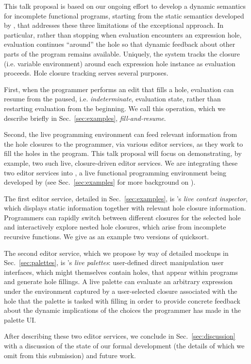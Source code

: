 This talk proposal is based on our ongoing effort to develop a dynamic semantics for incomplete functional programs, starting from the static semantics developed by \citet{popl-paper},  that addresses these three limitations of the exceptional approach. 
In particular, rather than stopping when evaluation encounters an expression hole, evaluation continues ``around'' the hole so that dynamic feedback about other parts of the program remains available. 
Uniquely, the system tracks the closure (i.e. variable environment) around each expression hole instance as evaluation proceeds. Hole closure tracking serves several purposes. 

First, when the programmer performs an edit that fills a hole, evaluation can resume from the paused, i.e. \emph{indeterminate}, evaluation state, rather than restarting evaluation from the beginning. We call this operation, which we describe briefly in Sec.~\ref{sec:examples}, \emph{fill-and-resume}. 

Second, the live programming environment can feed relevant information from the {hole closures} to the programmer, via various editor services, as they work to fill the holes in the program. 
This talk proposal will focus on demonstrating, by example, two such live, closure-driven editor services. We are integrating these two editor services into \Hazel, a live functional programming environment being developed by \citet{HazelnutSNAPL} (see Sec.~\ref{sec:examples} for more background on \Hazel). 

The first editor service, detailed in Sec.~\ref{sec:examples}, is \Hazel's \emph{live context inspector}, which displays static information together with relevant hole closure information. 
Programmers can rapidly switch between different closures for the selected hole and interactively explore nested hole closures, which arise from incomplete recursive functions. We give as an example two versions of quicksort.

The second editor service, which we propose by way of detailed mockups in Sec.~\ref{sec:palettes}, is \Hazel's \emph{live palettes}: user-defined direct manipulation user interfaces, which might themselves contain holes, that appear within
\Hazel programs and generate hole fillings. 
A live palette can evaluate an arbitrary expression under the environment captured by a user-selected closure associated with the hole that the palette is tasked with filling in order to provide concrete feedback
about the dynamic implications of the choices the programmer has made in the palette UI. 

After describing these two editor services, we conclude in Sec.~\ref{sec:discussion} with a discussion of the state of our formal development (the details of which we omit from this submission) and future work.